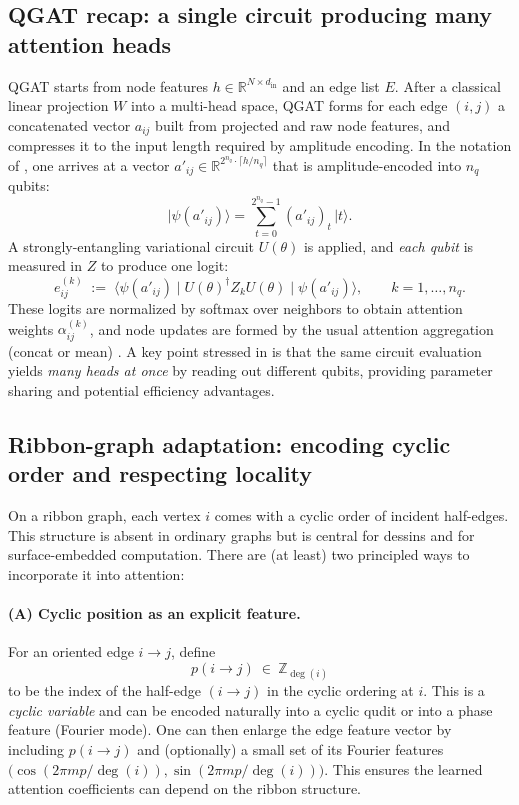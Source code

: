\documentclass[11pt,oneside]{amsbook}
\numberwithin{equation}{section}
\theoremstyle{plain}
\theoremstyle{definition}
\theoremstyle{remark}
\newcommand{\ket}[1]{\lvert #1 \rangle}
\begin{document}
\subsection{QGAT recap: a single circuit producing many attention heads}
\label{subsec:qgat_recap}

QGAT \cite{Ning2025QGAT} starts from node features $h\in\mathbb{R}^{N\times d_{\mathrm{in}}}$ and an edge list $E$.
After a classical linear projection $W$ into a multi-head space, QGAT forms for each edge $(i,j)$ a concatenated vector
$a_{ij}$ built from projected and raw node features, and compresses it to the input length required by amplitude encoding.
In the notation of \cite{Ning2025QGAT}, one arrives at a vector $a'_{ij}\in\mathbb{R}^{2^{n_q}\cdot \lceil h/n_q\rceil}$
that is amplitude-encoded into $n_q$ qubits:
\[
  \ket{\psi(a'_{ij})}=\sum_{t=0}^{2^{n_q}-1} (a'_{ij})_t\,\ket{t}.
\]
A strongly-entangling variational circuit $U(\theta)$ is applied, and \emph{each qubit} is measured in $Z$ to produce one logit:
\begin{equation}
  e^{(k)}_{ij}
  \;:=\;
  \langle \psi(a'_{ij})\mid U(\theta)^\dagger Z_k U(\theta)\mid \psi(a'_{ij})\rangle,
  \qquad k=1,\dots,n_q.
  \label{eq:qgat_logits_qubit}
\end{equation}
These logits are normalized by softmax over neighbors to obtain attention weights $\alpha^{(k)}_{ij}$, and node updates are formed
by the usual attention aggregation (concat or mean) \cite{Ning2025QGAT}.
A key point stressed in \cite{Ning2025QGAT} is that the same circuit evaluation yields \emph{many heads at once}
by reading out different qubits, providing parameter sharing and potential efficiency advantages.

\subsection{Ribbon-graph adaptation: encoding cyclic order and respecting locality}
\label{subsec:qgat_ribbon_adaptation}

On a ribbon graph, each vertex $i$ comes with a cyclic order of incident half-edges.
This structure is absent in ordinary graphs but is central for dessins and for surface-embedded computation.
There are (at least) two principled ways to incorporate it into attention:

\paragraph{(A) Cyclic position as an explicit feature.}
For an oriented edge $i\to j$, define
\[
  p(i\to j)\ \in\ \mathbb{Z}_{\deg(i)}
\]
to be the index of the half-edge $(i\to j)$ in the cyclic ordering at $i$.
This is a \emph{cyclic variable} and can be encoded naturally into a cyclic qudit or into a phase feature (Fourier mode).
One can then enlarge the edge feature vector by including $p(i\to j)$ and (optionally) a small set of its Fourier features
$\big(\cos(2\pi m p/\deg(i)),\sin(2\pi m p/\deg(i))\big)$.
This ensures the learned attention coefficients can depend on the ribbon structure.
\end{document}
